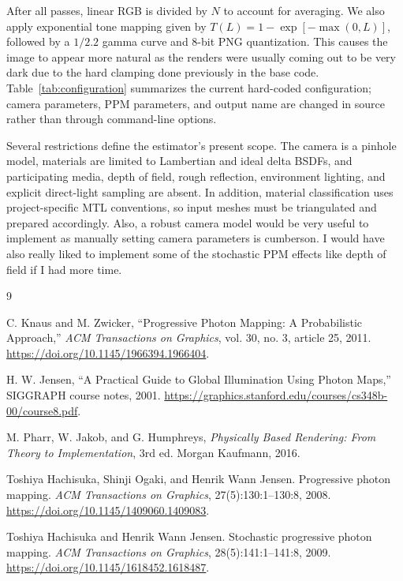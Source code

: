 \documentclass[10pt,twocolumn]{article}
\begin{document}
After all passes, linear RGB is divided by $N$ to account for averaging. We also apply exponential tone mapping given by 
$T(L)=1-\exp[-\max(0,L)]$, followed by a $1/2.2$ gamma curve and 8-bit
PNG quantization. This causes the image to appear more natural as the renders were usually coming out to be very dark due to the hard clamping done previously in the base code.  Table~\ref{tab:configuration} summarizes the current
hard-coded configuration; camera parameters, PPM parameters, and output name
are changed in source rather than through command-line options.

Several restrictions define the estimator's present scope.  The camera is a
pinhole model, materials are limited to Lambertian and ideal delta BSDFs, and
participating media, depth of field, rough reflection, environment lighting,
and explicit direct-light sampling are absent. In addition, material classification uses
project-specific MTL conventions, so input meshes must be triangulated and
prepared accordingly. Also, a robust camera model would be very useful to implement as manually setting camera parameters is cumberson. I would have also really liked to implement some of the stochastic PPM effects like depth of field if I had more time. 



\begin{thebibliography}{9}

C. Knaus and M. Zwicker,
``Progressive Photon Mapping: A Probabilistic Approach,''
\emph{ACM Transactions on Graphics}, vol. 30, no. 3, article 25, 2011.
\url{https://doi.org/10.1145/1966394.1966404}.

H. W. Jensen,
``A Practical Guide to Global Illumination Using Photon Maps,''
SIGGRAPH course notes, 2001.
\url{https://graphics.stanford.edu/courses/cs348b-00/course8.pdf}.

M. Pharr, W. Jakob, and G. Humphreys,
\emph{Physically Based Rendering: From Theory to Implementation},
3rd ed. Morgan Kaufmann, 2016.

Toshiya Hachisuka, Shinji Ogaki, and Henrik Wann Jensen.
\newblock Progressive photon mapping.
\newblock \emph{ACM Transactions on Graphics}, 27(5):130:1--130:8, 2008.
\newblock \url{https://doi.org/10.1145/1409060.1409083}.

Toshiya Hachisuka and Henrik Wann Jensen.
\newblock Stochastic progressive photon mapping.
\newblock \emph{ACM Transactions on Graphics}, 28(5):141:1--141:8, 2009.
\newblock \url{https://doi.org/10.1145/1618452.1618487}.

\end{thebibliography}
\end{document}

